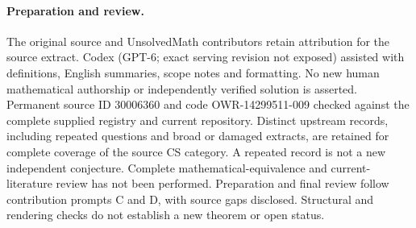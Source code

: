 \documentclass[11pt]{article}
\begin{document}
\paragraph{Preparation and review.}
The original source and UnsolvedMath contributors retain attribution for the source extract. Codex (GPT-6; exact serving revision not exposed) assisted with definitions, English summaries, scope notes and formatting. No new human mathematical authorship or independently verified solution is asserted. Permanent source ID 30006360 and code OWR-14299511-009 checked against the complete supplied registry and current repository. Distinct upstream records, including repeated questions and broad or damaged extracts, are retained for complete coverage of the source CS category. A repeated record is not a new independent conjecture. Complete mathematical-equivalence and current-literature review has not been performed. Preparation and final review follow contribution prompts C and D, with source gaps disclosed. Structural and rendering checks do not establish a new theorem or open status.
\label{end:30006360}
\end{document}
